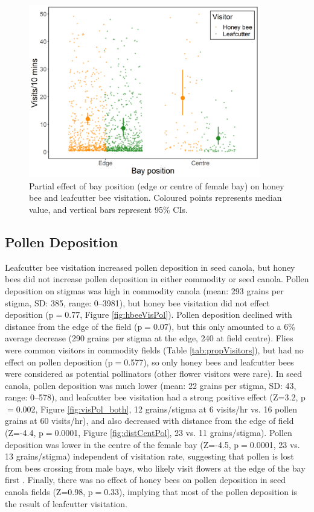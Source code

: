 \documentclass[12pt]{article} %
\begin{document}
\begin{figure}
    \centering
    \includegraphics[width=0.9\textwidth,keepaspectratio=true]{slopeEdgeCent_both.png}
    \caption[Partial effect of bay position on honey bee and leafcutter bee visitation]{Partial effect of bay position (edge or centre of female bay) on honey bee and leafcutter bee visitation. Coloured points represents median value, and vertical bars represent 95\% CIs.}
    \label{fig:edgeCentVis_both}
\end{figure}

\subsection{Pollen Deposition}

Leafcutter bee visitation increased pollen deposition in seed canola, but honey bees did not increase pollen deposition in either commodity or seed canola.
Pollen deposition on stigmas was high in commodity canola (mean: 293 grains per stigma, SD: 385, range: 0--3981), but honey bee visitation did not effect deposition (p$=$0.77, Figure \ref{fig:hbeeVisPol}).
Pollen deposition declined with distance from the edge of the field (p$=$0.07), but this only amounted to a 6\% average decrease (290 grains per stigma at the edge, 240 at field centre).
Flies were common visitors in commodity fields (Table \ref{tab:propVisitors}), but had no effect on pollen deposition (p$=$0.577), so only honey bees and leafcutter bees were considered as potential pollinators (other flower visitors were rare).
In seed canola, pollen deposition was much lower (mean: 22 grains per stigma, SD: 43, range: 0--578), and leafcutter bee visitation had a strong positive effect (Z=3.2, p$=$0.002, Figure \ref{fig:visPol_both}, 12 grains/stigma at 6 visits/hr vs. 16 pollen grains at 60 visits/hr), and also decreased with distance from the edge of field (Z=-4.4, p$=$0.0001, Figure \ref{fig:distCentPol}, 23 vs. 11 grains/stigma).
Pollen deposition was lower in the centre of the female bay (Z=-4.5, p$=$0.0001, 23 vs. 13 grains/stigma) independent of visitation rate, suggesting that pollen is lost from bees crossing from male bays, who likely visit flowers at the edge of the bay first \citep{pinnisch1990}. 
Finally, there was no effect of honey bees on pollen deposition in seed canola fields (Z=0.98, p$=$0.33), implying that most of the pollen deposition is the result of leafcutter visitation. 
\end{document}
